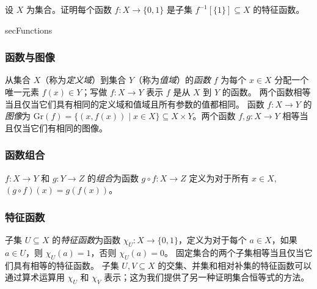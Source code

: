\begin{exercise}
\label{exCharacteristicFunctionsCorrespondWithSubsets}
设 $X$ 为集合。证明每个函数 $f : X \to \{0,1\}$ 是子集 $f^{-1}[\{1\}] \subseteq X$ 的特征函数。
\end{exercise}

\begin{tldr}{secFunctions}

\subsubsection*{函数与图像}

\begin{tldrlist}
 从集合 $X$（称为\textit{定义域}）到集合 $Y$（称为\textit{值域}）的\textit{函数} $f$ 为每个 $x \in X$ 分配一个唯一元素 $f(x) \in Y$；写做 $f : X \to Y$ 表示 $f$ 是从 $X$ 到 $Y$ 的函数。
 两个函数相等当且仅当它们具有相同的定义域和值域且所有参数的值都相同。
 函数 $f : X \to Y$ 的\textit{图像}为 $\mathrm{Gr}(f) = \{ (x,f(x)) \mid x \in X \} \subseteq X \times Y$。两个函数 $f,g : X \to Y$ 相等当且仅当它们有相同的图像。
\end{tldrlist}

\subsubsection*{函数组合}

\begin{tldrlist}
 $f : X \to Y$ 和 $g : Y \to Z$ 的\textit{组合}为函数 $g \circ f : X \to Z$ 定义为对于所有 $x \in X$, $(g \circ f)(x) = g(f(x))$。
\end{tldrlist}

\subsubsection*{特征函数}

\begin{tldrlist}
 子集 $U \subseteq X$ 的\textit{特征函数}为函数 $\chi_U : X \to \{ 0, 1 \}$，定义为对于每个 $a \in X$，如果 $a \in U$，则 $\chi_U(a) = 1$，否则 $\chi_U(a) = 0$。
 固定集合的两个子集相等当且仅当它们具有相等的特征函数。
 子集 $U,V \subseteq X$ 的交集、并集和相对补集的特征函数可以通过算术运算用 $\chi_U$ 和 $\chi_V$ 表示；这为我们提供了另一种证明集合恒等式的方法。
\end{tldrlist}


\end{tldr}
